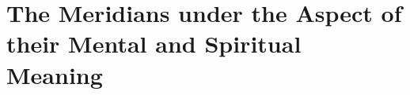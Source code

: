 \documentclass[../Book.Stress_regulation.tex]{subfiles}
\begin{document}
\chapter[Meridians: Mental and Spiritual Meaning]{The Meridians under the Aspect of their Mental and Spiritual Meaning}


\newpage

\newpage

\newpage
	
\newpage

\newpage

\newpage

\newpage

\newpage

\newpage

\newpage

\newpage


\end{document}
